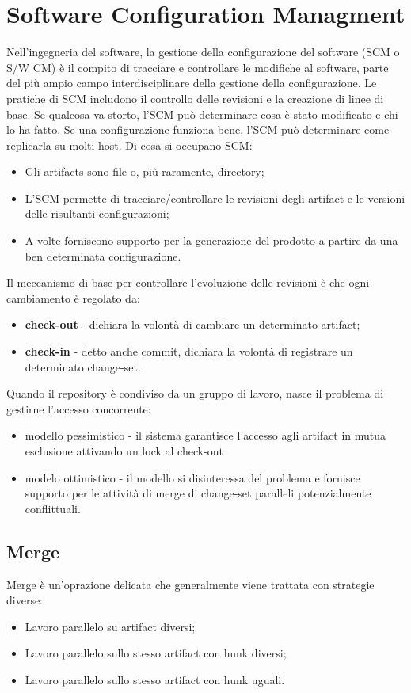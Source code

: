 \documentclass[a4paper,12pt,titlepage,oneside]{book}
\begin{document}
\chapter{Software Configuration Managment}
Nell'ingegneria del software, la gestione della configurazione del software (SCM o S/W CM) è il compito di tracciare e controllare le modifiche al software, 
parte del più ampio campo interdisciplinare della gestione della configurazione. Le pratiche di SCM includono il controllo delle revisioni e la creazione di 
linee di base. Se qualcosa va storto, l'SCM può determinare cosa è stato modificato e chi lo ha fatto. Se una configurazione funziona bene, l'SCM può 
determinare come replicarla su molti host.
Di cosa si occupano SCM:
\begin{itemize}
    \item Gli artifacts sono file o, più raramente, directory;
    \item L'SCM permette di tracciare/controllare le revisioni degli artifact e le versioni delle risultanti configurazioni;
    \item A volte forniscono supporto per la generazione del prodotto a partire da una ben determinata configurazione.
\end{itemize}

Il meccanismo di base per controllare l'evoluzione delle revisioni è che ogni cambiamento è regolato da:
\begin{itemize}
    \item \textbf{check-out} - dichiara la volontà di cambiare un determinato artifact;
    \item \textbf{check-in} - detto anche commit, dichiara la volontà di registrare un determinato change-set.
\end{itemize}

Quando il repository è condiviso da un gruppo di lavoro, nasce il problema di gestirne l'accesso concorrente:
\begin{itemize}
    \item modello pessimistico - il sistema garantisce l'accesso agli artifact in mutua esclusione attivando un lock al check-out
    \item modelo ottimistico - il modello si disinteressa del problema e fornisce supporto per le attività di merge di change-set paralleli potenzialmente conflittuali.
\end{itemize}

\section{Merge}
Merge è un'oprazione delicata che generalmente viene trattata con strategie diverse:
\begin{itemize}
    \item Lavoro parallelo su artifact diversi;
    \item Lavoro parallelo sullo stesso artifact con hunk diversi;
    \item Lavoro parallelo sullo stesso artifact con hunk uguali.
\end{itemize}
\end{document}
